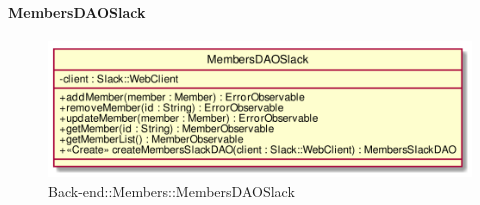 \hypertarget{MembersDAOSlack_label}{\paragraph{MembersDAOSlack}}
\begin{figure}[h]
	\centering
	\includegraphics[width=\textwidth,height=\textheight,keepaspectratio]{images/ClassMembersDAOSlack.png}
	\caption{Back-end::Members::MembersDAOSlack}
\end{figure}
